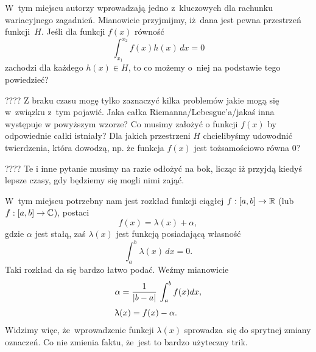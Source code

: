 \documentclass[a4paper,11pt]{article}
\begin{document}
\vspace{\spaceFour}





 W~tym miejscu autorzy wprowadzają jedno z~kluczowych dla
rachunku wariacyjnego zagadnień. Mianowicie przyjmijmy, iż~dana jest pewna
przestrzeń funkcji~$H$. Jeśli dla funkcji $f( x )$ równość
\begin{equation}
  \label{eq:Gelfand-Fomin-Year1972-06}
  \int_{ x_{ 1 } }^{ x_{ 2 } } f( x ) h( x ) \, dx = 0
\end{equation}
zachodzi dla każdego $h( x ) \in H$, to co możemy o~niej na podstawie tego
powiedzieć?

????
Z braku czasu mogę tylko zaznaczyć kilka problemów jakie mogą się w~związku
z~tym pojawić. Jaka całka Riemanna/Lebesgue’a/jakaś inna występuje w
powyższym wzorze? Co musimy założyć o funkcji $f( x )$ by odpowiednie całki
istniały? Dla jakich przestrzeni $H$ chcielibyśmy udowodnić twierdzenia,
która dowodzą, np. że funkcja $f( x )$ jest tożsamościowo równa 0?

????
Te i inne pytanie musimy na razie odłożyć na bok, licząc iż przyjdą kiedyś
lepsze czasy, gdy będziemy się mogli nimi zająć.

\vspace{\spaceFour}





 W~tym miejscu potrzebny nam jest rozkład funkcji ciągłej
$f : [ a, b ] \to \mathbb{R}$ (lub $f : [ a, b ] \to \mathbb{C}$), postaci
\begin{equation}
  \label{eq:Gelfand-Fomin-Year1972-07}
  f( x ) = \lambda( x ) + \alpha,
\end{equation}
gdzie $\alpha$ jest stałą, zaś $\lambda( x )$ jest funkcją posiadającą własność
\begin{equation}
  \label{eq:Gelfand-Fomin-Year1972-08}
  \int_{ a }^{ b } \lambda( x ) \, dx = 0.
\end{equation}
Taki rozkład da się bardzo łatwo podać. Weźmy mianowicie
\begin{subequations}
  \begin{align}
    \label{eq:Gelfand-Fomin-Year1972-09-A}
    &\alpha = \frac{ 1 }{ \lvert{  b - a  }\rvert } \, \int_{ a }^{ b } f( x ) dx, \\[0.3em]
    \label{eq:Gelfand-Fomin-Year1972-09-B}
    &\uplambda( x ) = f( x ) - \alpha.
  \end{align}
\end{subequations}
Widzimy więc, że~wprowadzenie funkcji $\lambda( x )$ sprowadza~się do sprytnej
zmiany oznaczeń. Co nie zmienia faktu, że~jest to bardzo użyteczny trik.
\end{document}
